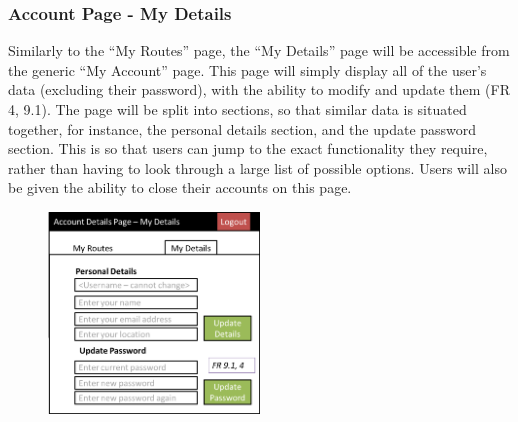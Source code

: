\subsubsection{Account Page - My Details}
Similarly to the ``My Routes'' page, the ``My Details'' page will be accessible from the generic ``My Account'' page. This page will simply display all of the user's data (excluding their password), with the ability to modify and update them (FR 4, 9.1). The page will be split into sections, so that similar data is situated together, for instance, the personal details section, and the update password section. This is so that users can jump to the exact functionality they require, rather than having to look through a large list of possible options. Users will also be given the ability to close their accounts on this page. 
\begin{figure}[!ht]
	\begin{center}
		\includegraphics[width=0.5\textwidth]{images/ui-mydetails.png}
	\end{center}
	\vspace{-12mm}
\end{figure}

